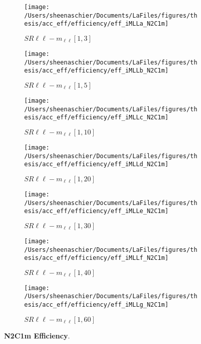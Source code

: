 \begin{figure}
        \centering
    \begin{subfigure}[b]{0.44\textwidth}
        \texttt{[image: /Users/sheenaschier/Documents/LaFiles/figures/thesis/acc\_eff/efficiency/eff\_iMLLa\_N2C1m]}
    \caption{$SR\ell\ell-m_{\ell\ell} [1, 3]$}
    \end{subfigure}
    \begin{subfigure}[b]{0.44\textwidth}
        \texttt{[image: /Users/sheenaschier/Documents/LaFiles/figures/thesis/acc\_eff/efficiency/eff\_iMLLb\_N2C1m]}
    \caption{$SR\ell\ell-m_{\ell\ell} [1, 5]$}
    \end{subfigure}
    \begin{subfigure}[b]{0.44\textwidth}
        \texttt{[image: /Users/sheenaschier/Documents/LaFiles/figures/thesis/acc\_eff/efficiency/eff\_iMLLc\_N2C1m]}
    \caption{$SR\ell\ell-m_{\ell\ell} [1, 10]$}
    \end{subfigure}
    \begin{subfigure}[b]{0.44\textwidth}
        \texttt{[image: /Users/sheenaschier/Documents/LaFiles/figures/thesis/acc\_eff/efficiency/eff\_iMLLd\_N2C1m]}
    \caption{$SR\ell\ell-m_{\ell\ell} [1, 20]$}
    \end{subfigure}
    \begin{subfigure}[b]{0.44\textwidth}
        \texttt{[image: /Users/sheenaschier/Documents/LaFiles/figures/thesis/acc\_eff/efficiency/eff\_iMLLe\_N2C1m]}
    \caption{$SR\ell\ell-m_{\ell\ell} [1, 30]$}
    \end{subfigure}
    \begin{subfigure}[b]{0.44\textwidth}
        \texttt{[image: /Users/sheenaschier/Documents/LaFiles/figures/thesis/acc\_eff/efficiency/eff\_iMLLf\_N2C1m]}
    \caption{$SR\ell\ell-m_{\ell\ell} [1, 40]$}
    \end{subfigure}
    \begin{subfigure}[b]{0.44\textwidth}
        \texttt{[image: /Users/sheenaschier/Documents/LaFiles/figures/thesis/acc\_eff/efficiency/eff\_iMLLg\_N2C1m]}
    \caption{$SR\ell\ell-m_{\ell\ell} [1, 60]$}
    \end{subfigure}
    \caption{\textbf{N2C1m Efficiency}.}
\end{figure}


